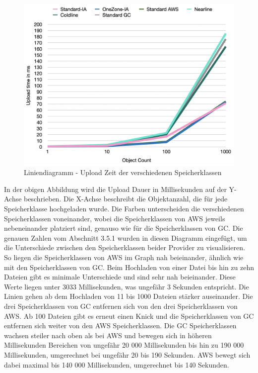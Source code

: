 \begin{figure}[h]
	\centering
	\includegraphics[width=13cm,keepaspectratio]{Pictures/UploadTime.png}
	\caption{Liniendiagramm - Upload Zeit der verschiedenen Speicherklassen}
\end{figure}	

In der obigen Abbildung wird die Upload Dauer in Millisekunden auf der Y-Achse beschrieben. Die X-Achse beschreibt die Objektanzahl, die für jede Speicherklasse hochgeladen wurde. Die Farben unterscheiden die verschiedenen Speicherklassen voneinander, wobei die Speicherklassen von AWS jeweils nebeneinander platziert sind, genauso wie für die Speicherklassen von GC. Die genauen Zahlen vom Abschnitt 3.5.1 wurden in diesen Diagramm eingefügt, um die Unterschiede zwischen den Speicherklassen beider Provider zu visualisieren. So liegen die Speicherklassen von AWS im Graph nah beieinander, ähnlich wie mit den Speicherklassen von GC. Beim Hochladen von einer Datei bis hin zu zehn Dateien gibt es minimale Unterschiede und sind sehr nah beieinander. Diese Werte liegen unter 3033 Millisekunden, was ungefähr 3 Sekunden entspricht. Die Linien gehen ab dem Hochladen von 11 bis 1000 Dateien stärker auseinander. Die drei Speicherklassen von GC entfernen sich von den drei Speicherklassen von AWS. Ab 100 Dateien gibt es erneut einen Knick und die Speicherklassen von GC entfernen sich weiter von den AWS Speicherklassen. Die GC Speicherklassen wachsen steiler nach oben als bei AWS und bewegen sich in höheren Millisekunden Bereichen von ungefähr 20 000 Millisekunden bis hin zu 190 000 Millisekunden, umgerechnet bei ungefähr 20 bis 190 Sekunden. AWS bewegt sich dabei maximal bis 140 000 Millisekunden, umgerechnet bis 140 Sekunden. 

